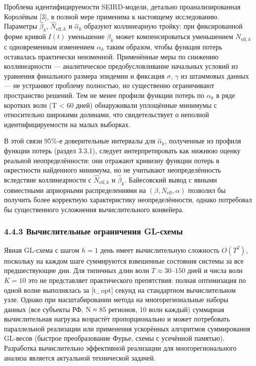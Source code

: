 \documentclass[12pt]{article}
\begin{document}
Проблема идентифицируемости SEIRD-модели, детально проанализированная
Королёвым {[}3{]}, в полной мере применима к настоящему исследованию.
Параметры \(\hat{\beta}_k\), \(\hat{N}_{\text{eff},k}\) и
\(\hat{\alpha}_k\) образуют коллинеарную тройку: при фиксированной форме
кривой \(I(t)\) уменьшение \(\beta_k\) может компенсироваться
уменьшением \(N_{\text{eff},k}\) с одновременным изменением \(\alpha_k\)
таким образом, чтобы функция потерь оставалась практически неизменной.
Применённые меры по снижению коллинеарности --- аналитическое
предобусловливание начальных условий из уравнения финального размера
эпидемии и фиксация \(\sigma\), \(\gamma\) из штаммовых данных --- не
устраняют проблему полностью, но существенно ограничивают пространство
решений. Тем не менее профили функции потерь по \(\alpha_k\) в ряде
коротких волн (T \textless{} 60 дней) обнаруживали уплощённые минимумы с
относительно широкими долинами, что свидетельствует о неполной
идентифицируемости на малых выборках.

В этой связи 95\%-е доверительные интервалы для \(\hat{\alpha}_k\),
полученные из профиля функции потерь (раздел 3.3.1), следует
интерпретировать как нижнюю оценку реальной неопределённости: они
отражают кривизну функции потерь в окрестности найденного минимума, но
не учитывают неопределённость вследствие коллинеарности с
\(\hat{N}_{\text{eff},k}\) и \(\hat{\beta}_k\). Байесовский вывод с
явными совместными априорными распределениями на
\((\beta, N_{\text{eff}}, \alpha)\) позволил бы получить более
корректную характеристику неопределённости, однако потребовал бы
существенного усложнения вычислительного конвейера.

\subsubsection{4.4.3 Вычислительные ограничения
GL-схемы}\label{ux432ux44bux447ux438ux441ux43bux438ux442ux435ux43bux44cux43dux44bux435-ux43eux433ux440ux430ux43dux438ux447ux435ux43dux438ux44f-gl-ux441ux445ux435ux43cux44b}

Явная GL-схема с шагом \(h = 1\) день имеет вычислительную сложность
\(O(T^2)\), поскольку на каждом шаге суммируются взвешенные состояния
системы за все предшествующие дни. Для типичных длин волн
\(T \approx 30\)--\(150\) дней и числа волн \(K = 10\) это не
представляет практического препятствия: полная оптимизация по одной
волне выполнялась за {[}t\_opt{]} секунд на стандартном вычислительном
узле. Однако при масштабировании метода на многорегиональные наборы
данных (все субъекты РФ, N ≈ 85 регионов, 10 волн каждый) суммарная
вычислительная нагрузка возрастёт пропорционально и может потребовать
параллельной реализации или применения ускорённых алгоритмов
суммирования GL-весов (быстрое преобразование Фурье, схемы с усечённой
памятью). Разработка вычислительно эффективной реализации для
многорегионального анализа является актуальной технической задачей.
\end{document}
